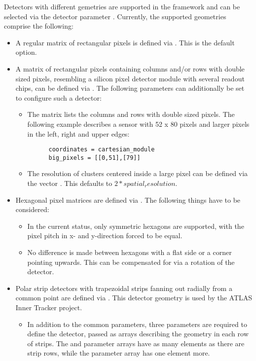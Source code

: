 Detectors with different gemetries are supported in the \corry framework and can be selected via the detector parameter . Currently, the supported geometries comprise the following:
\begin{itemize}
\item A regular matrix of rectangular pixels is defined via . This is the default option.
\item A matrix of rectangular pixels containing columns and/or rows with double sized pixels, resembling a silicon pixel detector module with several readout chips, can be defined via . The following parameters can additionally be set to configure such a detector:
  \begin{itemize}
  \item The matrix  lists the columns and rows with double sized pixels. The following example describes a sensor with 52 x 80 pixels and larger pixels in the left, right and upper edges:
    \begin{verbatim}
      coordinates = cartesian_module
      big_pixels = [[0,51],[79]]
    \end{verbatim}
  \item The resolution of clusters centered inside a large pixel can be defined via the vector . This defaults to $2 * spatial_resolution$.
  \end{itemize}
\item Hexagonal pixel matrices are defined via . The following things have to be considered:
  \begin{itemize}
  \item In the current status, only symmetric hexagons are supported, with the pixel pitch in x- and y-direction forced to be equal.
  \item No difference is made between hexagons with a flat side or a corner pointing upwards. This can be compensated for via a rotation of the detector.
  \end{itemize}
\item Polar strip detectors with trapezoidal strips fanning out radially from a common point are defined via . This detector geometry is used by the ATLAS Inner Tracker project.     
  \begin{itemize}
  \item In addition to the common parameters, three parameters are required to define the detector, passed as arrays describing the geometry in each row of strips. The  and  parameter arrays have as many elements as there are strip rows, while the  parameter array has one element more.

\end{itemize}
\end{itemize}
